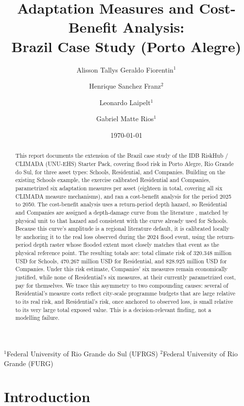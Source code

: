 \documentclass[11pt]{article}
\title{Adaptation Measures and Cost-Benefit Analysis:\\Brazil Case Study (Porto Alegre)}
\author{
Alisson Tallys Geraldo Fiorentin$^{1}$ \and
Henrique Sanchez Franz$^{2}$ \and
Leonardo Laipelt$^{1}$ \and
Gabriel Matte Rios$^{1}$
}
\date{\today}
\begin{document}
\maketitle

\begin{center}
\footnotesize
$^{1}$Federal University of Rio Grande do Sul (UFRGS) \quad
$^{2}$Federal University of Rio Grande (FURG)
\end{center}
\vspace{1em}

\begin{abstract}
This report documents the extension of the Brazil case study of the IDB RiskHub / CLIMADA
(UNU-EHS) Starter Pack, covering flood risk in Porto Alegre, Rio Grande do Sul, for three
asset types: Schools, Residential, and Companies. Building on the existing Schools example,
the exercise calibrated Residential and Companies, parametrized six adaptation measures per
asset (eighteen in total, covering all six CLIMADA measure mechanisms), and ran a
cost-benefit analysis for the period 2025 to 2050. The cost-benefit analysis uses a
return-period depth hazard, so Residential and Companies are assigned a depth-damage curve
from the literature \citep{huizinga2017}, matched by physical unit to that hazard and
consistent with the curve already used for Schools. Because this curve's amplitude is a
regional literature default, it is calibrated locally by anchoring it to the real loss
observed during the 2024 flood event, using the return-period depth raster whose flooded
extent most closely matches that event as the physical reference point. The resulting
totals are: total climate risk of 320.348 million USD for Schools, 470.267 million USD for
Residential, and 828.925 million USD for Companies. Under this risk estimate, Companies'
six measures remain economically justified, while none of Residential's six measures, at
their currently parametrized cost, pay for themselves. We trace this asymmetry to two
compounding causes: several of Residential's measure costs reflect city-scale programme
budgets that are large relative to its real risk, and Residential's risk, once anchored to
observed loss, is small relative to its very large total exposed value. This is a
decision-relevant finding, not a modelling failure.
\end{abstract}

\newpage
\tableofcontents
\newpage

\section{Introduction}
\end{document}
